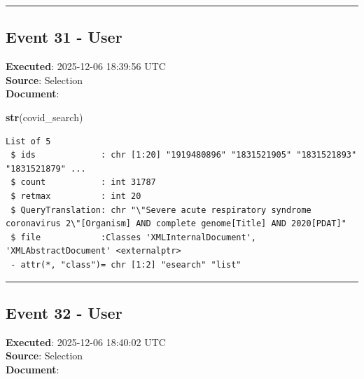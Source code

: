 \documentclass[
  11pt,
]{article}
\newenvironment{Shaded}{\begin{snugshade}}{\end{snugshade}}
\newcommand{\DecValTok}[1]{\textcolor[rgb]{0.00,0.00,0.81}{#1}}
\newcommand{\FunctionTok}[1]{\textcolor[rgb]{0.13,0.29,0.53}{\textbf{#1}}}
\newcommand{\NormalTok}[1]{#1}
\newcommand{\OtherTok}[1]{\textcolor[rgb]{0.56,0.35,0.01}{#1}}
\newcommand{\SpecialCharTok}[1]{\textcolor[rgb]{0.81,0.36,0.00}{\textbf{#1}}}
\newenvironment{rpoutput}{\vspace{0.5em}\begin{snugshade}}{\end{snugshade}}
\begin{document}
\begin{center}\rule{0.5\linewidth}{0.5pt}\end{center}

\subsection{Event 31 - User}\label{event-31---user}

\textbf{Executed}: 2025-12-06 18:39:56 UTC\\
\textbf{Source}: Selection\\
\textbf{Document}:

\begin{Shaded}
\begin{Highlighting}[]
\FunctionTok{str}\NormalTok{(covid\_search)}
\end{Highlighting}
\end{Shaded}

\begin{rpoutput}

\begin{verbatim}
List of 5
 $ ids             : chr [1:20] "1919480896" "1831521905" "1831521893" "1831521879" ...
 $ count           : int 31787
 $ retmax          : int 20
 $ QueryTranslation: chr "\"Severe acute respiratory syndrome coronavirus 2\"[Organism] AND complete genome[Title] AND 2020[PDAT]"
 $ file            :Classes 'XMLInternalDocument', 'XMLAbstractDocument' <externalptr> 
 - attr(*, "class")= chr [1:2] "esearch" "list"
\end{verbatim}

\end{rpoutput}

\begin{center}\rule{0.5\linewidth}{0.5pt}\end{center}

\subsection{Event 32 - User}\label{event-32---user}

\textbf{Executed}: 2025-12-06 18:40:02 UTC\\
\textbf{Source}: Selection\\
\textbf{Document}:

\begin{Shaded}
\end{Shaded}
\end{document}
